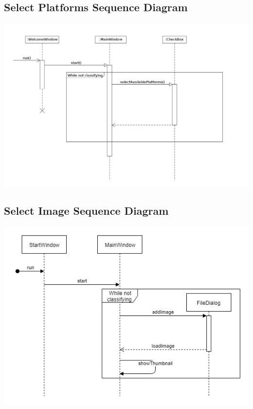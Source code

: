 \documentclass[parskip=full]{scrartcl}
\begin{document}
\pagebreak

\subsection {Select Platforms Sequence Diagram}

\begin{center}
\includegraphics[width=1.0\textwidth]{SelectPlatforms.jpg}
\end{center}

\subsection {Select Image Sequence Diagram}

\begin{center}
\includegraphics[width=1.0\textwidth]{SelectImageSeqDiag.jpg}
\end{center}
\end{document}
